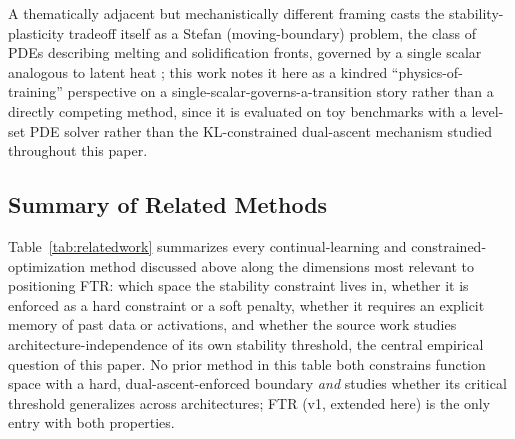 \documentclass[11pt]{article}
\begin{document}
A thematically adjacent but mechanistically different framing casts the
stability-plasticity tradeoff itself as a Stefan (moving-boundary) problem,
the class of PDEs describing melting and solidification fronts, governed
by a single scalar analogous to latent heat \citep{stefancl2026}; this work
notes it here as a kindred ``physics-of-training'' perspective on a
single-scalar-governs-a-transition story rather than a directly competing
method, since it is evaluated on toy benchmarks with a level-set PDE
solver rather than the KL-constrained dual-ascent mechanism studied
throughout this paper.

\subsection{Summary of Related Methods}
Table~\ref{tab:relatedwork} summarizes every continual-learning and
constrained-optimization method discussed above along the dimensions most
relevant to positioning FTR: which space the stability constraint lives
in, whether it is enforced as a hard constraint or a soft penalty, whether
it requires an explicit memory of past data or activations, and whether
the source work studies architecture-independence of its own stability
threshold, the central empirical question of this paper. No prior method
in this table both constrains function space with a hard,
dual-ascent-enforced boundary \emph{and} studies whether its critical
threshold generalizes across architectures; FTR (v1, extended here) is the
only entry with both properties.
\end{document}
